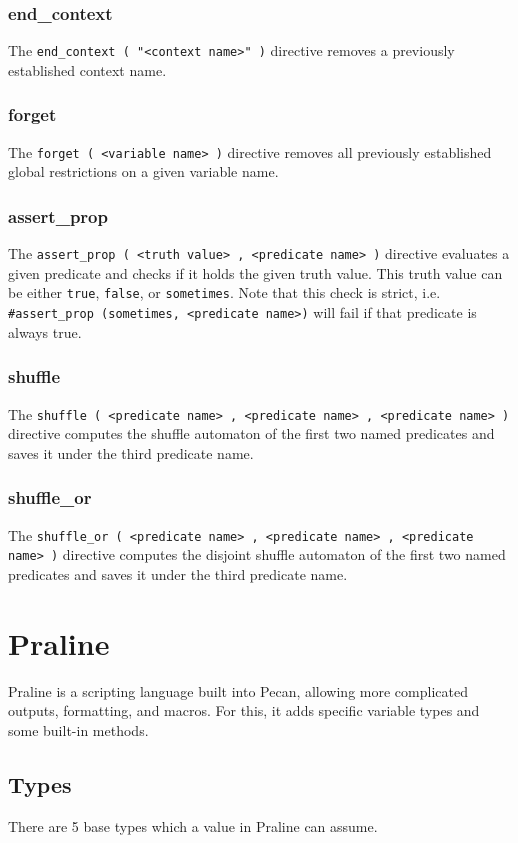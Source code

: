 \documentclass{report}
\begin{document}
\subsubsection{end\_context}
The \verb+end_context ( "<context name>" )+ directive removes a previously established context name.

\subsubsection{forget}
The \verb+forget ( <variable name> )+ directive removes all previously established global restrictions on a given variable name.

\subsubsection{assert\_prop}
The \verb+assert_prop ( <truth value> , <predicate name> )+ directive evaluates a given predicate and checks if it holds the given truth value.
This truth value can be either \verb+true+, \verb+false+, or \verb+sometimes+.
Note that this check is strict, i.e. \verb+#assert_prop (sometimes, <predicate name>)+ will fail if that predicate is always true.

\subsubsection{shuffle}
The \verb+shuffle ( <predicate name> , <predicate name> , <predicate name> )+ directive computes the shuffle automaton of the first two named predicates and saves it under the third predicate name.

\subsubsection{shuffle\_or}
The \verb+shuffle_or ( <predicate name> , <predicate name> , <predicate name> )+ directive computes the disjoint shuffle automaton of the first two named predicates and saves it under the third predicate name.


\section{Praline}
Praline is a scripting language built into Pecan, allowing more complicated outputs, formatting, and macros.
For this, it adds specific variable types and some built-in methods.


\subsection*{Types}
There are 5 base types which a value in Praline can assume.
\end{document}

